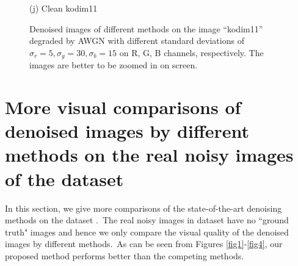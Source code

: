 \documentclass[10pt,onecolumn,letterpaper]{article}
\begin{document}
\begin{figure}
{\begin{minipage}[t]{0.195\textwidth}
{\footnotesize (j) Clean kodim11}
\end{minipage}
}
\caption{Denoised images of different methods on the image ``kodim11'' degraded by AWGN with different standard deviations of $\sigma_{r}=5, \sigma_{g}=30, \sigma_{b}=15$ on R, G, B channels, respectively. The images are better to be zoomed in on screen.}
\label{f1}
\vspace{2mm}
\end{figure}



\clearpage
\section{More visual comparisons of denoised images by different methods on the real noisy images of the dataset \cite{ncwebsite}}

In this section, we give more comparisons of the state-of-the-art denoising methods on the dataset \cite{ncwebsite}.\ The real noisy images in dataset \cite{ncwebsite} have no ``ground truth" images and hence we only compare the visual quality of the denoised images by different methods.\ As can be seen from Figures \ref{fig1}-\ref{fig4}, our proposed method performs better than the competing methods.
\end{document}
